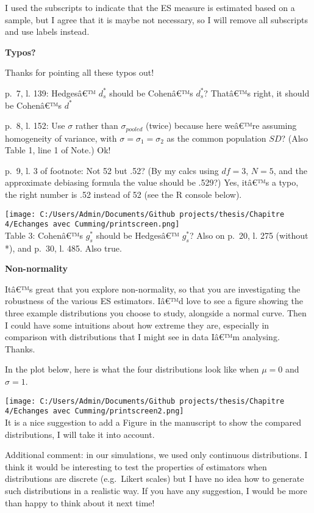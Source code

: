 \begin{appendix}
\color{blue} I used the subscripts to indicate that the ES measure is
estimated based on a sample, but I agree that it is maybe not necessary,
so I will remove all subscripts and use labels instead.

\color{black} \textbf{Typos?}

\color{blue} Thanks for pointing all these typos out!

\color{black} p.~7, l. 139: Hedgesâ€™ \(d_s^*\) should be Cohenâ€™s
\(d_s^*\)? \color{blue}Thatâ€™s right, it should be Cohenâ€™s \(d^*\)

\color{black} p.~8, l. 152: Use \(\sigma\) rather than
\(\sigma_{pooled}\) (twice) because here weâ€™re assuming homogeneity of
variance, with \(\sigma = \sigma_1 = \sigma_2\) as the common population
\(SD\)? (Also Table 1, line 1 of Note.) \color{blue} \color{blue}Ok!

\color{black} p.~9, l. 3 of footnote: Not 52 but .52? (By my calcs using
\(df = 3\), \(N = 5\), and the approximate debiasing formula the value
should be .529?) \color{blue} Yes, itâ€™s a typo, the right number is
.52 instead of 52 (see the R console below).

\texttt{[image: C:/Users/Admin/Documents/Github projects/thesis/Chapitre 4/Echanges avec Cumming/printscreen.png]}\\
\color{black} Table 3: Cohenâ€™s \(g_s^*\) should be Hedgesâ€™
\(g_s^*\)? Also on p.~20, l. 275 (without *), and p.~30, l. 485.
\color{blue} Also true.

\color{black} \textbf{Non-normality}

Itâ€™s great that you explore non-normality, so that you are
investigating the robustness of the various ES estimators. Iâ€™d love to
see a figure showing the three example distributions you choose to
study, alongside a normal curve. Then I could have some intuitions about
how extreme they are, especially in comparison with distributions that I
might see in data Iâ€™m analysing. Thanks.

\color{blue} In the plot below, here is what the four distributions look
like when \(\mu = 0\) and \(\sigma = 1\).

\texttt{[image: C:/Users/Admin/Documents/Github projects/thesis/Chapitre 4/Echanges avec Cumming/printscreen2.png]}\\
It is a nice suggestion to add a Figure in the manuscript to show the
compared distributions, I will take it into account.

Additional comment: in our simulations, we used only continuous
distributions. I think it would be interesting to test the properties of
estimators when distributions are discrete (e.g.~Likert scales) but I
have no idea how to generate such distributions in a realistic way. If
you have any suggestion, I would be more than happy to think about it
next time!


\end{appendix}
